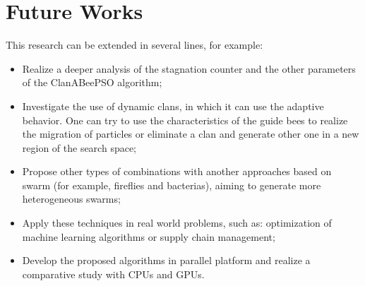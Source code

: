 \section{Future Works}
This research can be extended in several lines, for example:
\begin{itemize}
  \item Realize a deeper analysis of the stagnation counter and the other parameters of the ClanABeePSO algorithm;
  \item Investigate the use of dynamic clans, in which it can use the adaptive behavior. One can try to use the characteristics of the guide bees to realize the migration of particles or eliminate a clan and generate other one in a new region of the search space;
  \item Propose other types of combinations with another approaches based on swarm (for example, fireflies and bacterias), aiming to generate more heterogeneous swarms;
  \item Apply these techniques in real world problems, such as: optimization of machine learning algorithms or supply chain management;
  \item Develop the proposed algorithms in parallel platform and realize a comparative study with CPUs and GPUs.
\end{itemize}









\pagebreak
